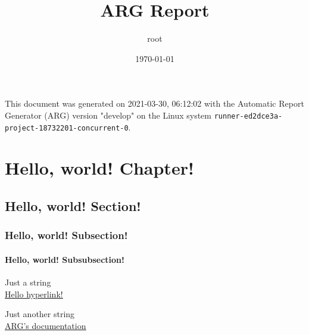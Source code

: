 \documentclass[letter,titlepage,oneside,11pt]{report}%
\title{\textbf{ARG Report}}%
\author{root}%
\date{\today}%
\begin{document}
%
\normalsize%
\maketitle%
\cleardoublepage%
This document was generated on 2021-03-30, 06:12:02 with the Automatic Report Generator (ARG) version "develop" on the Linux system \texttt{runner-ed2dce3a-project-18732201-concurrent-0}.%
\cleardoublepage%
\tableofcontents%
\listoffigures%
\listoftables%
\cleardoublepage%
\chapter{Hello, world! Chapter!}%
\par%
\section{Hello, world! Section!}%
\par%
\subsection{Hello, world! Subsection!}%
\par%
\subsubsection{Hello, world! Subsubsection!}%
\par%
\par%
Just a string%
\\%
\href{expected/build_tests-hello_world-Report-LaTeX.pdf}{\underline{Hello hyperlink!}}%
\\%
\par%
Just another string%
\\%
\href{https://automaticreportgenerator.gitlab.io/arg/}{\underline{ARG's documentation}}%
\\%
\end{document}
